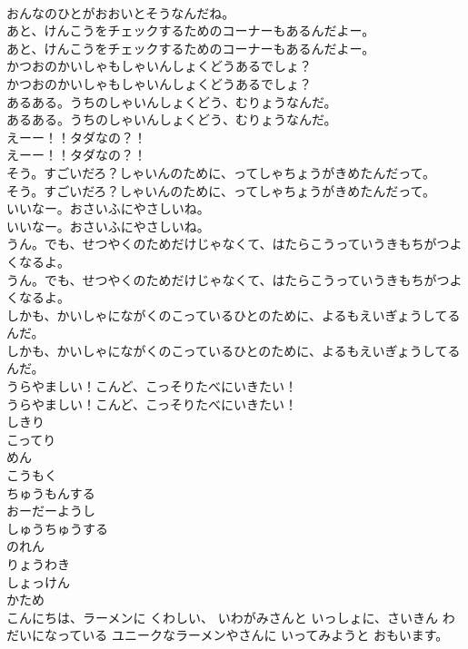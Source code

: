 \documentclass[8pt]{extreport}
\begin{document}
\begin{CJK}{UTF8}{min}
\\	おんなのひとがおおいとそうなんだね。
\\	あと、けんこうをチェックするためのコーナーもあるんだよー。
\\	あと、けんこうをチェックするためのコーナーもあるんだよー。
\\	かつおのかいしゃもしゃいんしょくどうあるでしょ？
\\	かつおのかいしゃもしゃいんしょくどうあるでしょ？
\\	あるある。うちのしゃいんしょくどう、むりょうなんだ。
\\	あるある。うちのしゃいんしょくどう、むりょうなんだ。
\\	えーー！！タダなの？！
\\	えーー！！タダなの？！
\\	そう。すごいだろ？しゃいんのために、ってしゃちょうがきめたんだって。
\\	そう。すごいだろ？しゃいんのために、ってしゃちょうがきめたんだって。
\\	いいなー。おさいふにやさしいね。
\\	いいなー。おさいふにやさしいね。
\\	うん。でも、せつやくのためだけじゃなくて、はたらこうっていうきもちがつよくなるよ。
\\	うん。でも、せつやくのためだけじゃなくて、はたらこうっていうきもちがつよくなるよ。
\\	しかも、かいしゃにながくのこっているひとのために、よるもえいぎょうしてるんだ。
\\	しかも、かいしゃにながくのこっているひとのために、よるもえいぎょうしてるんだ。
\\	うらやましい！こんど、こっそりたべにいきたい！
\\	うらやましい！こんど、こっそりたべにいきたい！
\\	しきり
\\	こってり
\\	めん
\\	こうもく
\\	ちゅうもんする
\\	おーだーようし
\\	しゅうちゅうする
\\	のれん
\\	りょうわき
\\	しょっけん
\\	かため
\\	こんにちは、ラーメンに くわしい、 いわがみさんと いっしょに、さいきん わだいになっている ユニークなラーメンやさんに いってみようと おもいます。

\end{CJK}
\end{document}
